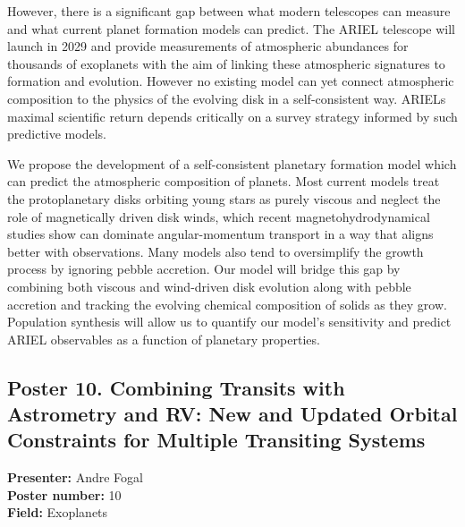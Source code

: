 However, there is a significant gap between what modern telescopes can measure and what current planet formation models can predict. The ARIEL telescope will launch in 2029 and provide measurements of atmospheric abundances for thousands of exoplanets with the aim of linking these atmospheric signatures to formation and evolution. However no existing model can yet connect atmospheric composition to the physics of the evolving disk in a self-consistent way. ARIELs maximal scientific return depends critically on a survey strategy informed by such predictive models.

We propose the development of a self-consistent planetary formation model which can predict the atmospheric composition of planets. Most current models treat the protoplanetary disks orbiting young stars as purely viscous and neglect the role of magnetically driven disk winds, which recent magnetohydrodynamical studies show can dominate angular-momentum transport in a way that aligns better with observations. Many models also tend to oversimplify the growth process by ignoring pebble accretion. Our model will bridge this gap by combining both viscous and wind-driven disk evolution along with pebble accretion and tracking the evolving chemical composition of solids as they grow. Population synthesis will allow us to quantify our model's sensitivity and predict ARIEL observables as a function of planetary properties.

\hypertarget{poster-abstract-talk-287}{}\label{poster-abstract-page-talk-287}
\subsection*{Poster 10. Combining Transits with Astrometry and RV: New and Updated Orbital Constraints for Multiple Transiting Systems}
\textbf{Presenter:} Andre Fogal\\
\textbf{Poster number:} 10\\
\textbf{Field:} Exoplanets

